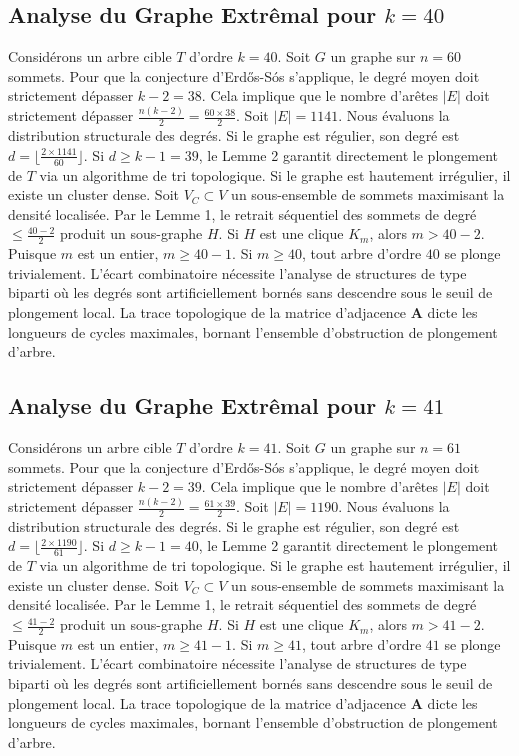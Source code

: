 \documentclass[11pt,a4paper]{article}
\begin{document}
\subsection{Analyse du Graphe Extr\^emal pour $k=40$}
Consid\'erons un arbre cible $T$ d'ordre $k=40$.
Soit $G$ un graphe sur $n=60$ sommets.
Pour que la conjecture d'Erd\H{o}s-S\'os s'applique, le degr\'e moyen doit strictement d\'epasser $k-2 = 38$.
Cela implique que le nombre d'ar\^etes $|E|$ doit strictement d\'epasser $\frac{n(k-2)}{2} = \frac{60 \times 38}{2}$.
Soit $|E| = 1141$.
Nous \'evaluons la distribution structurale des degr\'es. Si le graphe est r\'egulier, son degr\'e est $d = \lfloor \frac{2 \times 1141}{60} \rfloor$.
Si $d \geq k-1 = 39$, le Lemme 2 garantit directement le plongement de $T$ via un algorithme de tri topologique.
Si le graphe est hautement irr\'egulier, il existe un cluster dense. Soit $V_C \subset V$ un sous-ensemble de sommets maximisant la densit\'e localis\'ee.
Par le Lemme 1, le retrait s\'equentiel des sommets de degr\'e $\leq \frac{40-2}{2}$ produit un sous-graphe $H$.
Si $H$ est une clique $K_{m}$, alors $m > 40-2$. Puisque $m$ est un entier, $m \geq 40-1$. Si $m \geq 40$, tout arbre d'ordre $40$ se plonge trivialement.
L'\'ecart combinatoire n\'ecessite l'analyse de structures de type biparti o\`u les degr\'es sont artificiellement born\'es sans descendre sous le seuil de plongement local. La trace topologique de la matrice d'adjacence $\mathbf{A}$ dicte les longueurs de cycles maximales, bornant l'ensemble d'obstruction de plongement d'arbre.


\subsection{Analyse du Graphe Extr\^emal pour $k=41$}
Consid\'erons un arbre cible $T$ d'ordre $k=41$.
Soit $G$ un graphe sur $n=61$ sommets.
Pour que la conjecture d'Erd\H{o}s-S\'os s'applique, le degr\'e moyen doit strictement d\'epasser $k-2 = 39$.
Cela implique que le nombre d'ar\^etes $|E|$ doit strictement d\'epasser $\frac{n(k-2)}{2} = \frac{61 \times 39}{2}$.
Soit $|E| = 1190$.
Nous \'evaluons la distribution structurale des degr\'es. Si le graphe est r\'egulier, son degr\'e est $d = \lfloor \frac{2 \times 1190}{61} \rfloor$.
Si $d \geq k-1 = 40$, le Lemme 2 garantit directement le plongement de $T$ via un algorithme de tri topologique.
Si le graphe est hautement irr\'egulier, il existe un cluster dense. Soit $V_C \subset V$ un sous-ensemble de sommets maximisant la densit\'e localis\'ee.
Par le Lemme 1, le retrait s\'equentiel des sommets de degr\'e $\leq \frac{41-2}{2}$ produit un sous-graphe $H$.
Si $H$ est une clique $K_{m}$, alors $m > 41-2$. Puisque $m$ est un entier, $m \geq 41-1$. Si $m \geq 41$, tout arbre d'ordre $41$ se plonge trivialement.
L'\'ecart combinatoire n\'ecessite l'analyse de structures de type biparti o\`u les degr\'es sont artificiellement born\'es sans descendre sous le seuil de plongement local. La trace topologique de la matrice d'adjacence $\mathbf{A}$ dicte les longueurs de cycles maximales, bornant l'ensemble d'obstruction de plongement d'arbre.
\end{document}
